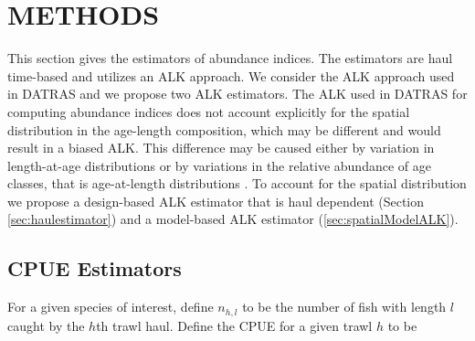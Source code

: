 \documentclass[a4paper 12pt]{article}
\numberwithin{equation}{section}
\begin{document}
\section{\large METHODS}
\label{sec:methods}
This section gives the estimators of abundance indices. The estimators are haul time-based and utilizes an ALK approach. We consider the ALK approach used in DATRAS and we propose two ALK estimators. The ALK used in DATRAS for computing abundance indices does not account explicitly for the spatial distribution in the age-length composition, which may be different and would result in a biased ALK. This difference may be caused either by variation in length-at-age distributions or by variations in the relative abundance of age classes, that is age-at-length distributions \citep{gerritsen2006simple}.  To account for the spatial distribution we propose a design-based ALK estimator that is haul dependent (Section \ref{sec:haulestimator}) and a model-based ALK estimator (\ref{sec:spatialModelALK}).

\subsection{CPUE Estimators}
\label{sec:cpueestimators}
For a given species of interest, define $n_{h,l}$ to be the number of fish with length $l$ caught by the $h$th trawl haul. Define the CPUE for a given trawl $h$ to be 
\end{document}
